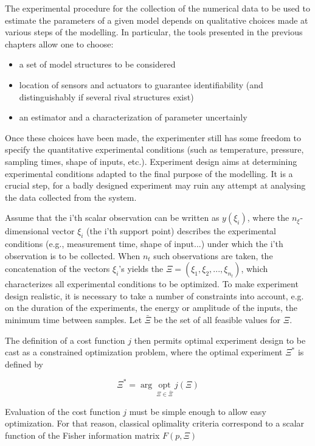 \documentclass[]{scrartcl}
\begin{document}
The experimental procedure for the collection of the numerical data to be used to estimate the parameters of a given model depends on qualitative choices made at various steps of the modelling. In particular, the tools presented in the previous chapters allow one to choose: 

\begin{itemize}
	\item a set of model structures to be considered
	\item location of sensors and actuators to guarantee identifiability (and distinguishably if several rival structures exist)
	\item an estimator and a characterization of parameter uncertainly
\end{itemize}

Once these choices have been made, the experimenter still has some freedom to specify the quantitative experimental conditions (such as temperature, pressure, sampling times, shape of inputs, etc.). Experiment design aims at determining experimental conditions adapted to the final purpose of the modelling. It is a crucial step, for a badly designed experiment may ruin any attempt at analysing the data collected from the system.

Assume that the i'th scalar observation can be written as $y(\xi_i)$, where the $n_\xi$-dimensional vector $\xi_i$ (the i'th support point) describes the experimental conditions (e.g., measurement time, shape of input...) under which the i'th observation is to be collected. When $n_t$ such observations are taken, the concatenation of the vectors $\xi_i$'s yields the $\Xi = (\xi_1, \xi_2,..., \xi_{n_t})$, which characterizes all experimental conditions to be optimized. To make experiment design realistic, it is necessary to take a number of constraints into account, e.g. on the duration of the experiments, the energy or amplitude of the inputs, the minimum time between samples. Let $\bar{\Xi}$ be the set of all feasible values for $\Xi$. 

The definition of a cost function $j$ then permits optimal experiment design to be cast as a constrained optimization problem, where the optimal experiment $\Xi^*$ is defined by

\begin{equation}
	\Xi^* = \arg~\underset{\Xi \in \bar{\Xi}}{\text{opt}}~j\left(\Xi\right)
\end{equation}

Evaluation of the cost function $j$ must be simple enough to allow easy optimization. For that reason, classical oplimality criteria correspond to a scalar function of the Fisher information matrix $F(p,\Xi)$
\end{document}
